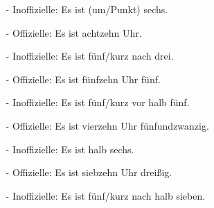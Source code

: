             \RaggedRight{} 
            \begin{multicols}{2}
                \begin{itemize}[topsep=0pt,itemsep=4pt,parsep=0pt]
                    \item[] 
                        \begin{itemize}
                            \item[-] Inoffizielle: Es ist (um/Punkt) sechs.
                            \item[-] Offizielle: Es ist achtzehn Uhr.
                        \end{itemize}
                    \item[] {\color{tropical_rain_forest}}
                        \begin{itemize}
                            \item[-] Inoffizielle: {\color{tropical_rain_forest}Es ist  fünf/kurz nach drei.}
                            \item[-] Offizielle: {\color{tropical_rain_forest}Es ist fünfzehn Uhr fünf.}
                        \end{itemize}
                    \item[] {\color{absolute_zero}}
                        \begin{itemize}
                            \item[-] Inoffizielle: {\color{absolute_zero}Es ist  fünf/kurz vor halb fünf.}
                            \item[-] Offizielle: {\color{absolute_zero}Es ist vierzehn Uhr fünfundzwanzig.}
                        \end{itemize}
                    \columnbreak
                    \item[] 
                        \begin{itemize}
                            \item[-] Inoffizielle: Es ist halb sechs.
                            \item[-] Offizielle: Es ist siebzehn Uhr dreißig.
                        \end{itemize}
                    \item[] {\color{saffron}}
                        \begin{itemize}
                            \item[-] Inoffizielle: {\color{saffron}Es ist  fünf/kurz nach halb sieben.}

\end{itemize}
\end{itemize}
\end{multicols}
